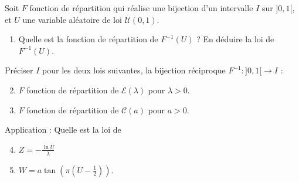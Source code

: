 \medskip

\begin{mdframed}
\begin{exercice} 
Soit $F$ fonction de répartition qui réalise une bijection d'un intervalle $I$ sur $]0, 1[$, et $U$ une variable aléatoire de loi $\mathcal{U}(0, 1)$.

\begin{enumerate}
    \item Quelle est la fonction de répartition de $F^{-1}(U)$ ? En déduire la loi de $F^{-1}(U)$.
\end{enumerate}
Préciser $I$ pour les deux lois suivantes, la bijection réciproque $F^{-1} : ]0, 1[ \to I$ :
\begin{enumerate}
    \setcounter{enumi}{1}
    \item $F$ fonction de répartition de $\mathcal{E}(\lambda)$ pour $\lambda > 0$.
    \item $F$ fonction de répartition de $\mathcal{C}(a)$ pour $a > 0$.
\end{enumerate}
Application : Quelle est la loi de
\begin{enumerate}
    \setcounter{enumi}{3}
    \item $Z = -\frac{\ln U}{\lambda}$
    \item $W = a \tan\left(\pi\left(U - \frac{1}{2}\right)\right)$.
\end{enumerate}
\end{exercice}
\end{mdframed}


